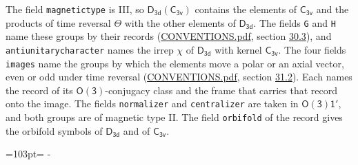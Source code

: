 \documentclass[10pt,a4paper]{article}
\newcommand{\needspace}[1]{\par\penalty-100\begingroup\dimen0=#1\relax\dimen2=\pagegoal
  \advance\dimen2-\pagetotal\ifdim\dimen0>\dimen2\relax\ifdim\dimen2>0pt\vfil\break\fi\fi
  \endgroup}
\numberwithin{equation}{section}
\newcommand{\grp}[1]{\mathsf{#1}}
\begin{document}
The field \texttt{magnetictype} is III, so $\grp{D_{3d}}(\grp{C_{3v}})$ contains the elements of $\grp{C_{3v}}$ and the products of time reversal $\varTheta$ with the other elements of $\grp{D_{3d}}$. The fields \texttt{G} and \texttt{H} name these groups by their records (\href{../../CONVENTIONS.pdf}{CONVENTIONS.pdf}, section \href{../../CONVENTIONS.pdf\#conv.30.3}{30.3}), and \texttt{antiunitarycharacter} names the irrep $\chi$ of $\grp{D_{3d}}$ with kernel $\grp{C_{3v}}$. The four fields \texttt{images} name the groups by which the elements move a polar or an axial vector, even or odd under time reversal (\href{../../CONVENTIONS.pdf}{CONVENTIONS.pdf}, section \href{../../CONVENTIONS.pdf\#conv.31.2}{31.2}). Each names the record of its $\grp{O(3)}$-conjugacy class and the frame that carries that record onto the image. The fields \texttt{normalizer} and \texttt{centralizer} are taken in $\grp{O(3)1'}$, and both groups are of magnetic type II. The field \texttt{orbifold} of the record gives the orbifold symbols of $\grp{D_{3d}}$ and of $\grp{C_{3v}}$.
\needspace{103pt}
\end{document}
